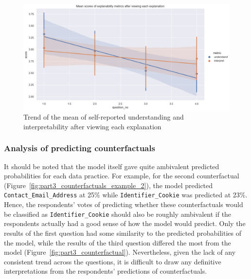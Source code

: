\begin{figure}[!ht]
    \centering
    \includegraphics[width=1\linewidth]{figures/part3.png}
    \caption{Trend of the mean of self-reported understanding and interpretability after viewing each explanation}
    \label{fig:part3_trend}
\end{figure}

\subsubsection{Analysis of predicting counterfactuals}
It should be noted that the model itself gave quite ambivalent predicted probabilities for each data practice. For example, for the second counterfactual (Figure~\ref{fig:part3_counterfactuals_example_2}), the model predicted \texttt{Contact\_Email\_Address} at 25\% while \texttt{Identifier\_Cookie} was predicted at 23\%. Hence, the respondents' votes of predicting whether these counterfactuals would be classified as \texttt{Identifier\_Cookie} should also be roughly ambivalent if the respondents actually had a good sense of how the model would predict. Only the results of the first question had some similarity to the predicted probabilities of the model, while the results of the third question differed the most from the model (Figure~\ref{fig:part3_counterfactual}). Nevertheless, given the lack of any consistent trend across the questions, it is difficult to draw any definitive interpretations from the respondents' predictions of counterfactuals.

